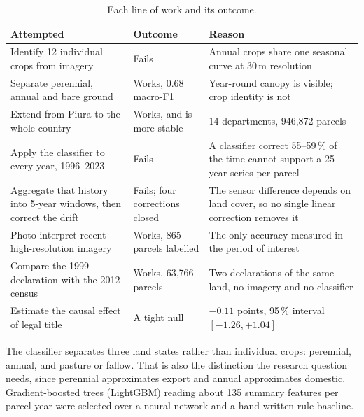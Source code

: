 \documentclass[11pt,a4paper]{article}
\begin{document}
\begin{table}[htbp]
\centering
\small
\caption{Each line of work and its outcome.}
\label{tab:scoreboard}
\begin{tabular}{@{}p{4.6cm}p{3.3cm}p{7.4cm}@{}}
\toprule
\textbf{Attempted} & \textbf{Outcome} & \textbf{Reason} \\
\midrule
Identify 12 individual crops from imagery
& Fails
& Annual crops share one seasonal curve at 30\,m resolution \\[0.25em]

Separate perennial, annual and bare ground
& Works, 0.68 macro-F1
& Year-round canopy is visible; crop identity is not \\[0.25em]

Extend from Piura to the whole country
& Works, and is more stable
& 14 departments, 946{,}872 parcels \\[0.25em]
Apply the classifier to every year, 1996--2023
& Fails
& A classifier correct 55--59\,\% of the time cannot support a 25-year series per parcel \\[0.25em]

Aggregate that history into 5-year windows, then correct the drift
& Fails; four corrections closed
& The sensor difference depends on land cover, so no single linear correction removes it \\[0.25em]

Photo-interpret recent high-resolution imagery
& Works, 865 parcels labelled
& The only accuracy measured in the period of interest \\[0.25em]

Compare the 1999 declaration with the 2012 census
& Works, 63{,}766 parcels
& Two declarations of the same land, no imagery and no classifier \\[0.25em]

Estimate the causal effect of legal title
& A tight null
& $-0.11$ points, 95\,\% interval $[-1.26, +1.04]$ \\
\bottomrule
\end{tabular}
\end{table}

The classifier separates three land states rather than individual crops: perennial, annual, and
pasture or fallow. That is also the distinction the research question needs, since perennial
approximates export and annual approximates domestic. Gradient-boosted trees (LightGBM) reading
about 135 summary features per parcel-year were selected over a neural network and a hand-written
rule baseline.
\end{document}
